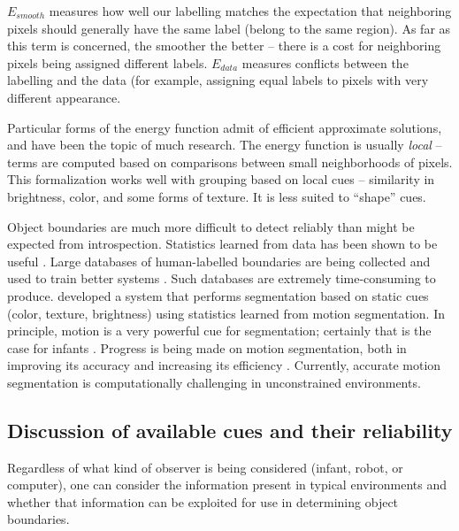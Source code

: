 $E_{smooth}$ measures how well our labelling matches the
expectation that neighboring pixels should generally have the
same label (belong to the same region).
As far as this term is concerned, the smoother the better -- there is
a cost for neighboring pixels being assigned different labels.
$E_{data}$ measures conflicts between the labelling and the data (for
example, assigning equal labels to pixels with very different
appearance.

Particular forms of the energy function admit of efficient 
approximate solutions, and have been the topic of much research.
%
The energy function is usually {\em local} -- terms are computed 
based on comparisons between small neighborhoods of pixels.
%
This formalization works well with grouping based on local
cues -- similarity in brightness, color, and some forms of texture.
It is less suited to ``shape'' cues.


Object boundaries are much more difficult to detect reliably than might be 
expected from introspection.
Statistics learned from data has been shown to be useful
\cite{konishi03statistical}.  Large databases of 
human-labelled boundaries are being collected and
used to train better systems
\cite{martin04learning}.
%
Such databases are extremely time-consuming to produce.
%
 developed a system that performs
segmentation based on static cues (color, texture, brightness)
using statistics learned from motion segmentation.
In principle, motion is a very powerful cue for
segmentation; certainly that is the case for infants
\cite{kellman93kinematic}.
%
Progress is being made on motion segmentation, both 
in improving its accuracy and increasing its efficiency
 \cite{cremers05motion,fowlkes04spectral,smith03motion,smith04layered}.
%
Currently, accurate motion segmentation is 
computationally challenging in unconstrained environments.

\fi


\ifverbose

\subsection{Discussion of available cues and their reliability}

Regardless of what kind of observer is being considered (infant,
robot, or computer), one can consider the information present
in typical environments and whether that information can be
exploited for use in determining object boundaries.

